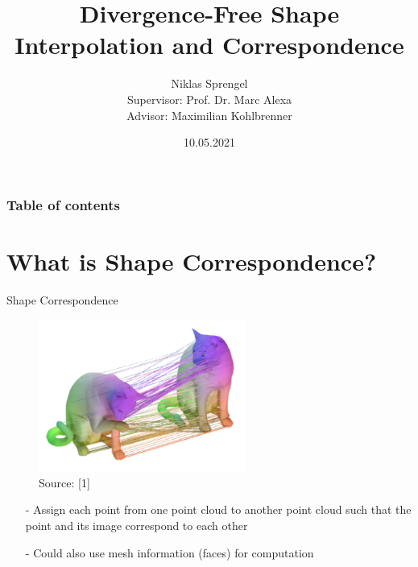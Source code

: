 \documentclass[xcolor=dvipsnames]{beamer}
\title[Divergence-Free Shape Interpolation]{Divergence-Free Shape Interpolation and Correspondence}
\author[CG]{Niklas Sprengel \\ Supervisor: Prof. Dr. Marc Alexa\\Advisor: Maximilian Kohlbrenner}
\institute{TU Berlin}
\date{10.05.2021}
\begin{document}
\begin{frame}
  \titlepage
\end{frame}
\begin{frame}
\frametitle{Table of contents}
\tableofcontents
\end{frame}

\section{What is Shape Correspondence?}
\begin{frame}{Shape Correspondence}
\begin{figure}
\includegraphics[height=5cm]{Pictures/cat.png}
\caption*{Source: [1]}
\end{figure}
\begin{enumerate}
\item[-] Assign each point from one point cloud to another point cloud such that the point and its image correspond to each other
\item[-] Could also use mesh information (faces) for computation
\end{enumerate}
\end{frame}
\end{document}
